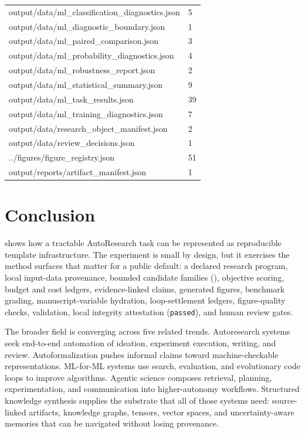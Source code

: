 \documentclass[
]{article}
\begin{document}
\begin{longtable}[]{@{}ll@{}}
output/data/ml\_classification\_diagnostics.json & 5 \\
output/data/ml\_diagnostic\_boundary.json & 1 \\
output/data/ml\_paired\_comparison.json & 3 \\
output/data/ml\_probability\_diagnostics.json & 4 \\
output/data/ml\_robustness\_report.json & 2 \\
output/data/ml\_statistical\_summary.json & 9 \\
output/data/ml\_task\_results.json & 39 \\
output/data/ml\_training\_diagnostics.json & 7 \\
output/data/research\_object\_manifest.json & 2 \\
output/data/review\_decisions.json & 1 \\
../figures/figure\_registry.json & 51 \\
output/reports/artifact\_manifest.json & 1 \\
\end{longtable}

\newpage

\section{Conclusion}\label{sec:conclusion}

 shows how a tractable
AutoResearch task can be represented as reproducible template
infrastructure. The
 experiment is
small by design, but it exercises the method surfaces that matter for a
public default: a declared research program, local input-data
provenance, bounded candidate families
(),
objective scoring, budget and cost ledgers, evidence-linked claims,
generated figures, benchmark grading, manuscript-variable hydration,
loop-settlement ledgers, figure-quality checks, validation, local
integrity attestation (\texttt{passed}), and human review gates.

The broader field is converging across five related trends. Autoresearch
systems seek end-to-end automation of ideation, experiment execution,
writing, and review. Autoformalization pushes informal claims toward
machine-checkable representations. ML-for-ML systems use search,
evaluation, and evolutionary code loops to improve algorithms. Agentic
science composes retrieval, planning, experimentation, and communication
into higher-autonomy workflows. Structured knowledge synthesis supplies
the substrate that all of those systems need: source-linked artifacts,
knowledge graphs, tensors, vector spaces, and uncertainty-aware memories
that can be navigated without losing provenance.
\end{document}
